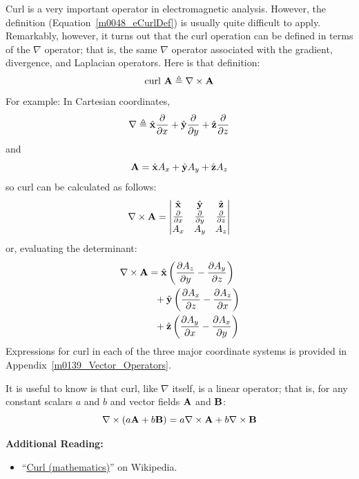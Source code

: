 Curl is a very important operator in electromagnetic analysis.
However, the definition (Equation~\ref{m0048_eCurlDef}) is usually quite difficult to apply.
Remarkably, however, it turns out that the curl operation can be defined in terms of the $\nabla$ operator; that is, the same $\nabla$ operator associated with the gradient, divergence, and Laplacian operators.  Here is that definition:
%
\begin{equation}
\mbox{curl}~{\bf A} \triangleq \nabla \times {\bf A}
\end{equation}
%
For example:
In Cartesian coordinates,
%
\begin{equation}
\nabla \triangleq \hat{\bf x}\frac{\partial}{\partial x} + \hat{\bf y}\frac{\partial}{\partial y} + \hat{\bf z}\frac{\partial}{\partial z} 
\end{equation}
%
and
%
\begin{equation}
{\bf A} = \hat{\bf x}A_x + \hat{\bf y}A_y + \hat{\bf z}A_z 
\end{equation}
%
so curl can be calculated as follows:
%
\begin{equation}
\nabla\times{\bf A} =
\begin{vmatrix}
\hat{\bf x} & \hat{\bf y} & \hat{\bf z} \\
\frac{\partial}{\partial x} & \frac{\partial}{\partial y} & \frac{\partial}{\partial z} \\
A_x & A_y & A_z 
\end{vmatrix}
\end{equation}
%
or, evaluating the determinant:
%   
\begin{equation}
\begin{split}
\nabla \times {\bf A} &= \hat{\bf x}\left( \frac{\partial A_z}{\partial y} - \frac{\partial A_y}{\partial z} \right) \\
                      &~~ +\hat{\bf y}\left( \frac{\partial A_x}{\partial z} - \frac{\partial A_z}{\partial x} \right) \\
                      &~~ +\hat{\bf z}\left( \frac{\partial A_y}{\partial x} - \frac{\partial A_x}{\partial y} \right) 
\end{split}
\end{equation}
%
Expressions for curl in each of the three major coordinate systems is provided in Appendix~\ref{m0139_Vector_Operators}. 

It is useful to know is that curl, like $\nabla$ itself, is a linear operator; that is, for any constant scalars $a$ and $b$ and vector fields ${\bf A}$ and ${\bf B}$:
%
\begin{equation}
\nabla \times \left( a{\bf A} + b{\bf B} \right) = a \nabla \times {\bf A} + b \nabla \times {\bf B}
\end{equation}


{\bf Additional Reading:}
\begin{itemize}
\item ``\href{https://en.wikipedia.org/wiki/Curl_(mathematics)}{Curl (mathematics)}'' on Wikipedia.
\end{itemize}



